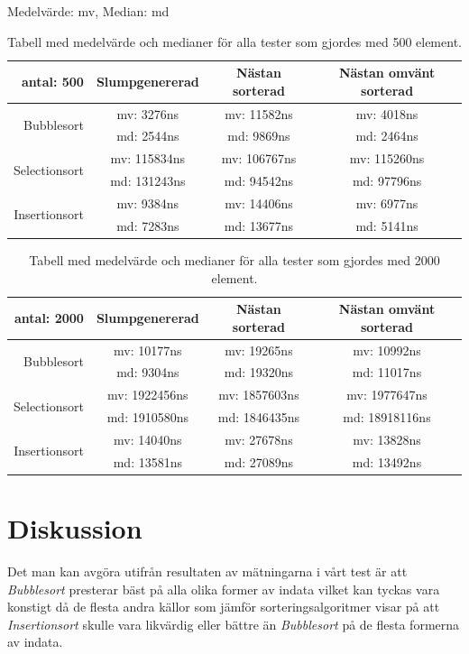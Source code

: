 \documentclass[a4paper]{article}
\begin{document}
Medelvärde: mv, Median: md 
\begin{table}[H]
	\begin{tabular}{r|c|c|c|}
		antal: 500 & Slumpgenererad & Nästan sorterad & Nästan omvänt sorterad \\ \hline
		\multirow{2}{*}{Bubblesort}    & mv: 3276ns & mv: 11582ns & mv: 4018ns \\
		                               & md: 2544ns & md: 9869ns & md: 2464ns \\ \hline
		\multirow{2}{*}{Selectionsort} & mv: 115834ns & mv: 106767ns & mv: 115260ns \\
		                               & md: 131243ns & md: 94542ns & md: 97796ns \\ \hline
		\multirow{2}{*}{Insertionsort} & mv: 9384ns & mv: 14406ns & mv: 6977ns \\
		                               & md: 7283ns & md: 13677ns & md: 5141ns \\ \hline	
	\end{tabular}
	\caption{Tabell med medelvärde och medianer för alla tester som gjordes med 500 element.}
\end{table}
\begin{table}[H]
	\begin{tabular}{r|c|c|c|}
		antal: 2000 & Slumpgenererad & Nästan sorterad & Nästan omvänt sorterad \\ \hline
		\multirow{2}{*}{Bubblesort}    & mv: 10177ns & mv: 19265ns & mv: 10992ns \\
		                               & md: 9304ns & md: 19320ns & md: 11017ns \\ \hline
		\multirow{2}{*}{Selectionsort} & mv: 1922456ns & mv: 1857603ns & mv: 1977647ns \\
		                               & md: 1910580ns & md: 1846435ns & md: 18918116ns \\ \hline
		\multirow{2}{*}{Insertionsort} & mv: 14040ns & mv: 27678ns & mv: 13828ns \\
		                               & md: 13581ns & md: 27089ns & md: 13492ns \\ \hline	
	\end{tabular}
	\caption{Tabell med medelvärde och medianer för alla tester som gjordes med 2000 element.}
\end{table}

\section{Diskussion}
Det man kan avgöra utifrån resultaten av mätningarna i vårt test är att \emph{Bubblesort} presterar bäst på alla olika former av indata vilket kan tyckas vara konstigt då de flesta andra källor som jämför sorteringsalgoritmer visar på att \emph{Insertionsort} skulle vara likvärdig eller bättre än \emph{Bubblesort} på de flesta formerna av indata.
\end{document}
